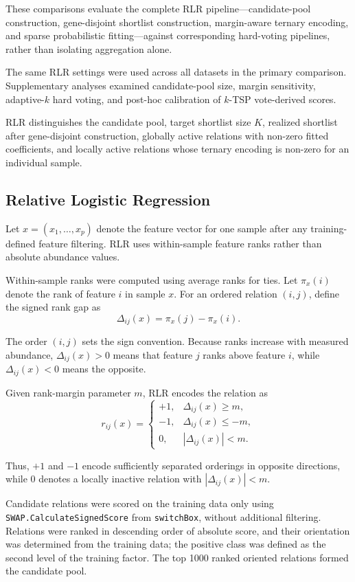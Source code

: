 \documentclass[preprint,12pt,a4paper]{elsarticle}
\begin{document}
These comparisons evaluate the complete RLR pipeline---candidate-pool construction, gene-disjoint shortlist construction, margin-aware ternary encoding, and sparse probabilistic fitting---against corresponding hard-voting pipelines, rather than isolating aggregation alone.

The same RLR settings were used across all datasets in the primary comparison. Supplementary analyses examined candidate-pool size, margin sensitivity, adaptive-$k$ hard voting, and post-hoc calibration of $k$-TSP vote-derived scores.

RLR distinguishes the candidate pool, target shortlist size $K$, realized shortlist after gene-disjoint construction, globally active relations with non-zero fitted coefficients, and locally active relations whose ternary encoding is non-zero for an individual sample.

\subsection{Relative Logistic Regression}

Let $x=(x_1,\ldots,x_p)$ denote the feature vector for one sample after any training-defined feature filtering. RLR uses within-sample feature ranks rather than absolute abundance values.

Within-sample ranks were computed using average ranks for ties. Let $\pi_x(i)$ denote the rank of feature $i$ in sample $x$. For an ordered relation $(i,j)$, define the signed rank gap as
\[
\Delta_{ij}(x)=\pi_x(j)-\pi_x(i).
\]

The order $(i,j)$ sets the sign convention. Because ranks increase with measured abundance, $\Delta_{ij}(x)>0$ means that feature $j$ ranks above feature $i$, while $\Delta_{ij}(x)<0$ means the opposite.

Given rank-margin parameter $m$, RLR encodes the relation as
\[
r_{ij}(x)=
\begin{cases}
+1, & \Delta_{ij}(x)\ge m,\\
-1, & \Delta_{ij}(x)\le -m,\\
0,  & |\Delta_{ij}(x)|<m.
\end{cases}
\]

Thus, $+1$ and $-1$ encode sufficiently separated orderings in opposite directions, while $0$ denotes a locally inactive relation with $|\Delta_{ij}(x)|<m$.

Candidate relations were scored on the training data only using \texttt{SWAP.}\allowbreak\texttt{CalculateSignedScore} from \texttt{switchBox}, without additional filtering. Relations were ranked in descending order of absolute score, and their orientation was determined from the training data; the positive class was defined as the second level of the training factor. The top 1000 ranked oriented relations formed the candidate pool.
\end{document}
